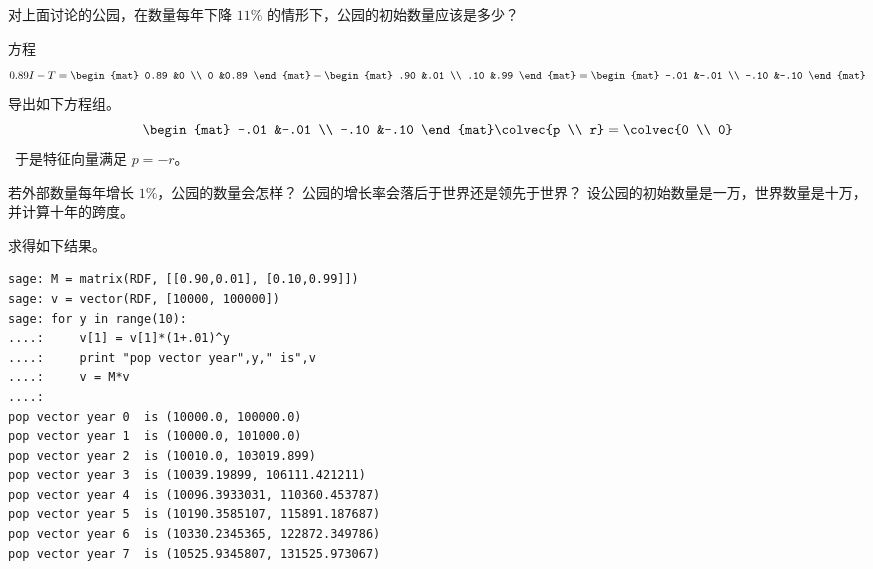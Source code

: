 \begin{exercises}
  \item
    对上面讨论的公园，在数量每年下降 $11\%$
    的情形下，公园的初始数量应该是多少？
    \begin{answer}
      方程
      \begin{equation*}
         0.89I-T
         =
         \begin{mat}
           0.89 &0 \\
           0 &0.89
         \end{mat}
         -
         \begin{mat}
           .90  &.01  \\
           .10  &.99
         \end{mat}
         =
         \begin{mat}
           -.01  &-.01  \\
           -.10  &-.10
         \end{mat}
      \end{equation*}
      导出如下方程组。
      \begin{equation*}
        \begin{mat}
          -.01  &-.01  \\
          -.10  &-.10
        \end{mat}
        \colvec{p \\ r}
        =
        \colvec{0  \\ 0}
      \end{equation*}\
      于是特征向量满足 $p=-r$。
    \end{answer}
  \item
    若外部数量每年增长 $1\%$，公园的数量会怎样？
    公园的增长率会落后于世界还是领先于世界？
    设公园的初始数量是一万，世界数量是十万，
    并计算十年的跨度。
    \begin{answer}
      \Sage{} 求得如下结果。
\begin{lstlisting}
sage: M = matrix(RDF, [[0.90,0.01], [0.10,0.99]])
sage: v = vector(RDF, [10000, 100000])
sage: for y in range(10):
....:     v[1] = v[1]*(1+.01)^y
....:     print "pop vector year",y," is",v
....:     v = M*v
....:
pop vector year 0  is (10000.0, 100000.0)
pop vector year 1  is (10000.0, 101000.0)
pop vector year 2  is (10010.0, 103019.899)
pop vector year 3  is (10039.19899, 106111.421211)
pop vector year 4  is (10096.3933031, 110360.453787)
pop vector year 5  is (10190.3585107, 115891.187687)
pop vector year 6  is (10330.2345365, 122872.349786)
pop vector year 7  is (10525.9345807, 131525.973067)

\end{lstlisting}
\end{answer}
\end{exercises}
